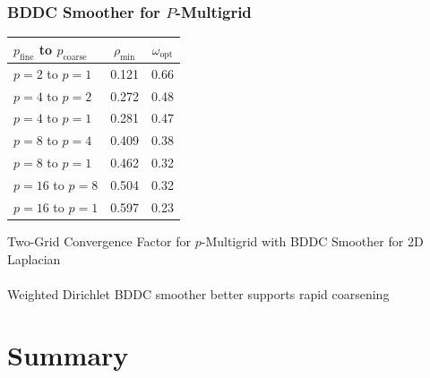 \documentclass{beamer}
\begin{document}
\begin{frame}
\begin{center}
\frametitle{BDDC Smoother for $P$-Multigrid}

\begin{table}[ht!]
\begin{center}
\begin{tabular}{l cc}
  \toprule
  $p_{\text{fine}}$ to $p_{\text{coarse}}$  & $\rho_{\min}$ & $\omega_{\text{opt}}$  \\
  \toprule
  $p = 2$ to $p = 1$   &  0.121 & 0.66  \\
  \midrule
  $p = 4$ to $p = 2$   &  0.272 & 0.48  \\
  $p = 4$ to $p = 1$   &  0.281 & 0.47  \\
  \midrule
  $p = 8$ to $p = 4$   &  0.409 & 0.38  \\
  $p = 8$ to $p = 1$   &  0.462 & 0.32  \\
  \midrule
  $p = 16$ to $p = 8$  &  0.504 & 0.32  \\
  $p = 16$ to $p = 1$  &  0.597 & 0.23  \\
  \bottomrule
\end{tabular}
\end{center}
\label{table:two_grid_bddc_smoother}
\end{table}
{\small Two-Grid Convergence Factor for $p$-Multigrid with BDDC Smoother for 2D Laplacian}\\

~\\

Weighted Dirichlet BDDC smoother better supports rapid coarsening\\

\end{center}
\end{frame}

\section{Summary}
\end{document}
